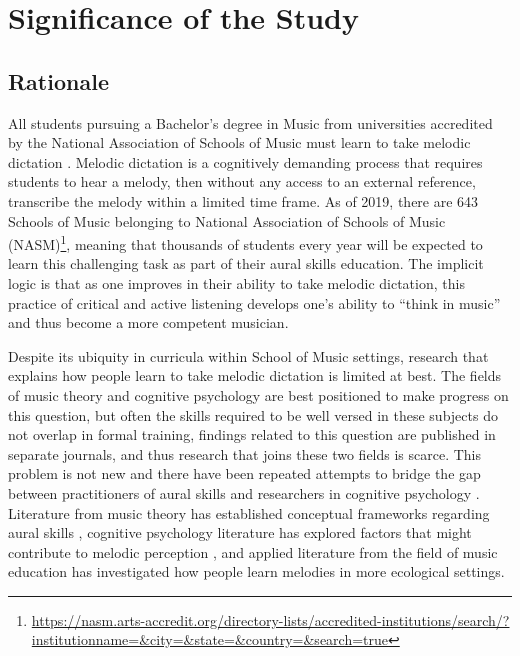 \documentclass[12pt,]{book}
\let\rmarkdownfootnote\footnote%
\def\footnote{\protect\rmarkdownfootnote}
\begin{document}
\mainmatter

\hypertarget{significance-of-the-study}{%
\chapter{Significance of the Study}\label{significance-of-the-study}}

\hypertarget{rationale}{%
\section{Rationale}\label{rationale}}

All students pursuing a Bachelor's degree in Music from universities accredited by the National Association of Schools of Music must learn to take melodic dictation \citep[§VIII.6.B.2.A]{nasmNationalAssociationSchools2019}.
Melodic dictation is a cognitively demanding process that requires students to hear a melody, then without any access to an external reference, transcribe the melody within a limited time frame.
As of 2019, there are 643 Schools of Music belonging to National Association of Schools of Music (NASM)\footnote{\url{https://nasm.arts-accredit.org/directory-lists/accredited-institutions/search/?institutionname=\&city=\&state=\&country=\&search=true}}, meaning that thousands of students every year will be expected to learn this challenging task as part of their aural skills education.
The implicit logic is that as one improves in their ability to take melodic dictation, this practice of critical and active listening develops one's ability to ``think in music'' \citep{bestMusicCurriculaFuture1992, karpinskiAuralSkillsAcquisition2000} and thus become a more competent musician.

Despite its ubiquity in curricula within School of Music settings, research that explains how people learn to take melodic dictation is limited at best.
The fields of music theory and cognitive psychology are best positioned to make progress on this question, but often the skills required to be well versed in these subjects do not overlap in formal training, findings related to this question are published in separate journals, and thus research that joins these two fields is scarce.
This problem is not new and there have been repeated attempts to bridge the gap between practitioners of aural skills and researchers in cognitive psychology \citep{butlerBridgesUnbuiltComparing1993, davidbutlerWhyGulfMusic1997a, klonoskiImprovingDictationAuralSkills2006, klonoskiPerceptualLearningHierarchy2000, pembrookSendHelpAural1990, karpinskiAuralSkillsAcquisition2000}.
Literature from music theory has established conceptual frameworks regarding aural skills \citep{karpinskiAuralSkillsAcquisition2000}, cognitive psychology literature has explored factors that might contribute to melodic perception \citep{dowlingExpectancyAttentionMelody1990, dowlingScaleContourTwo1978, dowlingTonalStrengthMelody1991, halpernMemoryMelodies2010}, and applied literature from the field of music education \citep{buonviriEffectsTwoListening2017, buonviriMelodicDictationInstruction2015, paneyEffectDirectingAttention2016} has investigated how people learn melodies in more ecological settings.
\end{document}
